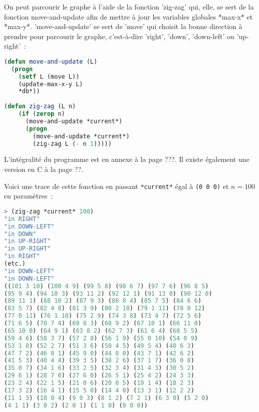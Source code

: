 \documentclass{article}
\begin{document}
On peut parcourir le graphe à l'aide de la fonction 'zig-zag' qui, elle, se sert de la fonction move-and-update afin de mettre à jour les variables globales *max-x* et *max-y*. 'move-and-update' se sert de 'move' qui choisit la bonne direction à prendre pour parcourir le graphe, c'est-à-dire 'right', 'down', 'down-left' ou 'up-right'~:

\begin{lstlisting}[language=Lisp]
(defun move-and-update (L)
  (progn
    (setf L (move L))
    (update-max-x-y L)
    *db*))
 
(defun zig-zag (L n)
    (if (zerop n) 
      (move-and-update *current*)
      (progn
        (move-and-update *current*)
        (zig-zag L (- n 1)))))
\end{lstlisting}



L'intégralité du programme est en annexe à la page ???. Il existe également une version en C à la page ??.

Voici une trace de cette fonction en passant \lstinline!*current*! égal à \lstinline!(0 0 0)! et $n = 100$ en paramètres~:

\begin{lstlisting}[language=Lisp]
> (zig-zag *current* 100)
"in RIGHT" 
"in DOWN-LEFT" 
"in DOWN" 
"in UP-RIGHT" 
"in UP-RIGHT" 
"in RIGHT" 
(etc.)
"in DOWN-LEFT" 
"in DOWN-LEFT" 
((101 3 10) (100 4 9) (99 5 8) (98 6 7) (97 7 6) (96 8 5) 
(95 9 4) (94 10 3) (93 11 2) (92 12 1) (91 13 0) (90 12 0) 
(89 11 1) (88 10 2) (87 9 3) (86 8 4) (85 7 5) (84 6 6) 
(83 5 7) (82 4 8) (81 3 9) (80 2 10) (79 1 11) (78 0 12) 
(77 0 11) (76 1 10) (75 2 9) (74 3 8) (73 4 7) (72 5 6) 
(71 6 5) (70 7 4) (69 8 3) (68 9 2) (67 10 1) (66 11 0) 
(65 10 0) (64 9 1) (63 8 2) (62 7 3) (61 6 4) (60 5 5) 
(59 4 6) (58 3 7) (57 2 8) (56 1 9) (55 0 10) (54 0 9) 
(53 1 8) (52 2 7) (51 3 6) (50 4 5) (49 5 4) (48 6 3) 
(47 7 2) (46 8 1) (45 9 0) (44 8 0) (43 7 1) (42 6 2) 
(41 5 3) (40 4 4) (39 3 5) (38 2 6) (37 1 7) (36 0 8) 
(35 0 7) (34 1 6) (33 2 5) (32 3 4) (31 4 3) (30 5 2) 
(29 6 1) (28 7 0) (27 6 0) (26 5 1) (25 4 2) (24 3 3) 
(23 2 4) (22 1 5) (21 0 6) (20 0 5) (19 1 4) (18 2 3) 
(17 3 2) (16 4 1) (15 5 0) (14 4 0) (13 3 1) (12 2 2) 
(11 1 3) (10 0 4) (9 0 3) (8 1 2) (7 2 1) (6 3 0) (5 2 0) 
(4 1 1) (3 0 2) (2 0 1) (1 1 0) (0 0 0))
\end{lstlisting}
\end{document}
